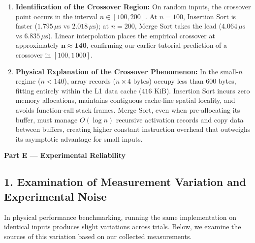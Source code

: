 \documentclass[11pt]{article}
\begin{document}
\begin{enumerate}
    \item \textbf{Identification of the Crossover Region:}
    On random inputs, the crossover point occurs in the interval $n \in [100, 200]$. At $n = 100$, Insertion Sort is faster ($1.795\,\mu\text{s}$ vs $2.018\,\mu\text{s}$); at $n = 200$, Merge Sort takes the lead ($4.064\,\mu\text{s}$ vs $6.835\,\mu\text{s}$). Linear interpolation places the empirical crossover at approximately $\mathbf{n \approx 140}$, confirming our earlier tutorial prediction of a crossover in $[100, 1\,000]$.

    \item \textbf{Physical Explanation of the Crossover Phenomenon:}
    In the small-$n$ regime ($n < 140$), array records ($n \times 4$ bytes) occupy less than $600$ bytes, fitting entirely within the L1 data cache ($416\text{ KiB}$). Insertion Sort incurs zero memory allocations, maintains contiguous cache-line spatial locality, and avoids function-call stack frames. Merge Sort, even when pre-allocating its buffer, must manage $O(\log n)$ recursive activation records and copy data between buffers, creating higher constant instruction overhead that outweighs its asymptotic advantage for small inputs.
\end{enumerate}

\newpage

{\centering\fontsize{15}{18}\selectfont\textbf{Part E --- Experimental Reliability}\par}
\vspace{0.3em}

\subsection*{1. Examination of Measurement Variation and Experimental Noise}
In physical performance benchmarking, running the same implementation on identical inputs produces slight variations across trials. Below, we examine the sources of this variation based on our collected measurements.
\end{document}
